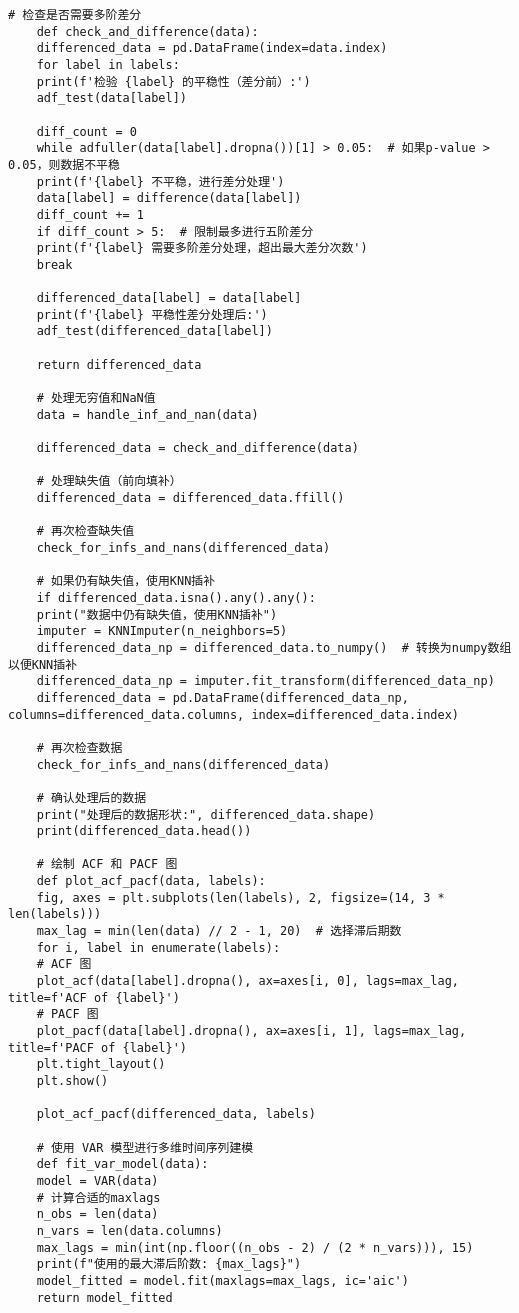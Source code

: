 \begin{lstlisting}[caption={问题四处理代码}]
	# 检查是否需要多阶差分
	def check_and_difference(data):
	differenced_data = pd.DataFrame(index=data.index)
	for label in labels:
	print(f'检验 {label} 的平稳性（差分前）:')
	adf_test(data[label])
	
	diff_count = 0
	while adfuller(data[label].dropna())[1] > 0.05:  # 如果p-value > 0.05，则数据不平稳
	print(f'{label} 不平稳，进行差分处理')
	data[label] = difference(data[label])
	diff_count += 1
	if diff_count > 5:  # 限制最多进行五阶差分
	print(f'{label} 需要多阶差分处理，超出最大差分次数')
	break
	
	differenced_data[label] = data[label]
	print(f'{label} 平稳性差分处理后:')
	adf_test(differenced_data[label])
	
	return differenced_data
	
	# 处理无穷值和NaN值
	data = handle_inf_and_nan(data)
	
	differenced_data = check_and_difference(data)
	
	# 处理缺失值（前向填补）
	differenced_data = differenced_data.ffill()
	
	# 再次检查缺失值
	check_for_infs_and_nans(differenced_data)
	
	# 如果仍有缺失值，使用KNN插补
	if differenced_data.isna().any().any():
	print("数据中仍有缺失值，使用KNN插补")
	imputer = KNNImputer(n_neighbors=5)
	differenced_data_np = differenced_data.to_numpy()  # 转换为numpy数组以便KNN插补
	differenced_data_np = imputer.fit_transform(differenced_data_np)
	differenced_data = pd.DataFrame(differenced_data_np, columns=differenced_data.columns, index=differenced_data.index)
	
	# 再次检查数据
	check_for_infs_and_nans(differenced_data)
	
	# 确认处理后的数据
	print("处理后的数据形状:", differenced_data.shape)
	print(differenced_data.head())
	
	# 绘制 ACF 和 PACF 图
	def plot_acf_pacf(data, labels):
	fig, axes = plt.subplots(len(labels), 2, figsize=(14, 3 * len(labels)))
	max_lag = min(len(data) // 2 - 1, 20)  # 选择滞后期数
	for i, label in enumerate(labels):
	# ACF 图
	plot_acf(data[label].dropna(), ax=axes[i, 0], lags=max_lag, title=f'ACF of {label}')
	# PACF 图
	plot_pacf(data[label].dropna(), ax=axes[i, 1], lags=max_lag, title=f'PACF of {label}')
	plt.tight_layout()
	plt.show()
	
	plot_acf_pacf(differenced_data, labels)
	
	# 使用 VAR 模型进行多维时间序列建模
	def fit_var_model(data):
	model = VAR(data)
	# 计算合适的maxlags
	n_obs = len(data)
	n_vars = len(data.columns)
	max_lags = min(int(np.floor((n_obs - 2) / (2 * n_vars))), 15)
	print(f"使用的最大滞后阶数: {max_lags}")
	model_fitted = model.fit(maxlags=max_lags, ic='aic')
	return model_fitted
	

\end{lstlisting}

